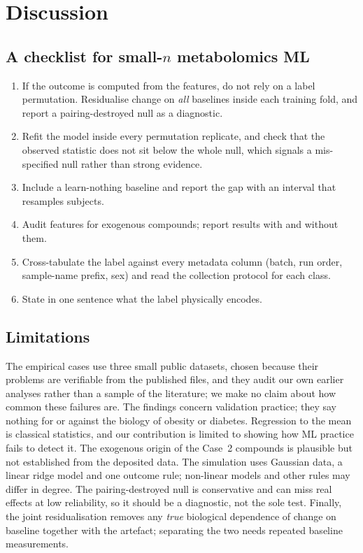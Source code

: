 \documentclass[conference]{IEEEtran}
\begin{document}
\section{Discussion}
\label{sec:discussion}

\subsection{A checklist for small-$n$ metabolomics ML}
\begin{enumerate}
  \item If the outcome is computed from the features, do not rely on a
        label permutation. Residualise change on \emph{all} baselines inside
        each training fold, and report a pairing-destroyed null as a
        diagnostic.
  \item Refit the model inside every permutation replicate, and check that
        the observed statistic does not sit below the whole null, which
        signals a mis-specified null rather than strong evidence.
  \item Include a learn-nothing baseline and report the gap with an interval
        that resamples subjects.
  \item Audit features for exogenous compounds; report results with and
        without them.
  \item Cross-tabulate the label against every metadata column (batch, run
        order, sample-name prefix, sex) and read the collection protocol for
        each class.
  \item State in one sentence what the label physically encodes.
\end{enumerate}

\subsection{Limitations}
The empirical cases use three small public datasets, chosen because their
problems are verifiable from the published files, and they audit our own
earlier analyses rather than a sample of the literature; we make no claim
about how common these failures are. The findings concern validation
practice; they say nothing for or against the biology of obesity or diabetes.
Regression to the mean is classical statistics, and our contribution is
limited to showing how ML practice fails to detect it. The exogenous origin
of the Case~2 compounds is plausible but not established from the deposited
data. The simulation uses Gaussian data, a linear ridge model and one outcome
rule; non-linear models and other rules may differ in degree. The
pairing-destroyed null is conservative and can miss real effects at low
reliability, so it should be a diagnostic, not the sole test. Finally, the
joint residualisation removes any \emph{true} biological dependence of change
on baseline together with the artefact; separating the two needs repeated
baseline measurements.
\end{document}
